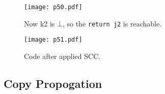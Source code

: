 \begin{figure}[H]
	\centering
	\texttt{[image: p50.pdf]}
	\caption{Now k2 is $\bot$, so the \texttt{return j2} is reachable.}
	\label{fig:p50}

\end{figure}



\begin{figure}[H]
	\centering
	\texttt{[image: p51.pdf]}
	\caption{Code after applied SCC.}
	\label{fig:p51}

\end{figure}






\subsection{Copy Propogation}

